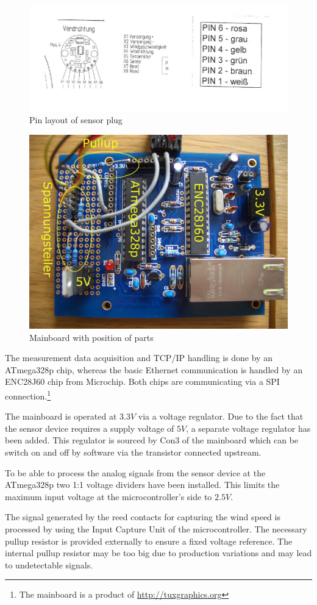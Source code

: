 \begin{figure}[ht]
    \centering
    \includegraphics[width=0.6\linewidth]{graphics/pinlayout.jpg}
    \caption{Pin layout of sensor plug}
    \label{fig:pinlayout}
\end{figure}

\begin{figure}[ht]
    \centering
    \includegraphics[width=0.6\linewidth]{graphics/mainboard.jpg}
    \caption{Mainboard with position of parts}
    \label{fig:mainboard}
\end{figure}

The measurement data acquisition and TCP/IP handling is done by an ATmega328p chip, whereas the basic Ethernet communication is handled by an ENC28J60 chip from Microchip. Both chips are communicating via a SPI connection.\footnote{The mainboard is a product of \url{http://tuxgraphics.org}} 

The mainboard is operated at $3.3 V$ via a voltage regulator. Due to the fact that the sensor device requires a supply voltage of $5 V$, a separate voltage regulator has been added. This regulator is sourced by Con3 of the mainboard which can be switch on and off by software via the transistor connected upstream.

To be able to process the analog signals from the sensor device at the ATmega328p two 1:1 voltage dividers have been installed. This limits the maximum input voltage at the microcontroller's side to $2.5 V$.

The signal generated by the reed contacts for capturing the wind speed is processed by using the Input Capture Unit of the microcontroller. The necessary pullup resistor is provided externally to ensure a fixed voltage reference. The internal pullup resistor may be too big due to production variations and may lead to undetectable signals.

